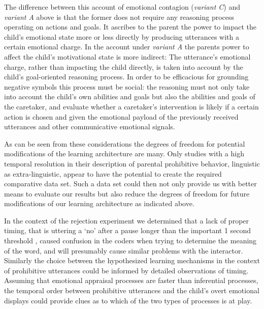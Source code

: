 The difference between this account of emotional contagion (\emph{variant C}) and \emph{variant A} above is that the former does not require any reasoning process operating
on actions and goals. It ascribes to the parent the power to impact the child's emotional state more or less directly by producing utterances with a certain emotional
charge. In the account under \emph{variant A} the parents power to affect the child's motivational state is more indirect: The utterance's emotional charge, rather than
impacting the child directly, is taken into account by the child's goal-oriented reasoning process. In order to be efficacious for grounding negative symbols this process
must be social: the reasoning must not only take into account the child's own abilities and goals but also the abilities and goals of the caretaker, and evaluate whether a
caretaker's intervention is likely if a certain action is chosen and given the emotional payload of the previously received utterances and other communicative emotional
signals.

As can be seen from these considerations the degrees of freedom for potential modifications of the learning architecture are many. Only studies with a high temporal resolution
in their description of parental prohibitive behavior, linguistic as extra-linguistic, appear to have the potential to create the required comparative data set. Such a data set could
then not only provide us with better means to evaluate our results but also reduce the degrees of freedom for future modifications of our learning architecture as indicated
above.

In the context of the rejection experiment \cite{Foerster2017} we determined that a lack of proper timing, that is uttering a `no' after a pause longer than the important 1 
second threshold \cite{Jefferson1989}, caused confusion in the coders when trying to determine the meaning of the word, and will presumably cause similar problems with the
interactor. 
Similarly the choice between the hypothesized learning mechanisms in the context of prohibitive utterances could be informed by detailed observations of timing. 
Assuming that emotional appraisal processes are faster than inferential processes, the temporal order between prohibitive utterances and the child's overt emotional displays 
could provide clues as to which of the two types of processes is at play.

